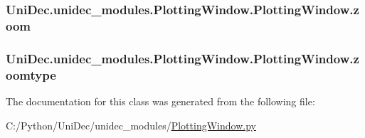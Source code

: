 \subsubsection[{zoom}]{\setlength{\rightskip}{0pt plus 5cm}Uni\+Dec.\+unidec\+\_\+modules.\+Plotting\+Window.\+Plotting\+Window.\+zoom}\label{class_uni_dec_1_1unidec__modules_1_1_plotting_window_1_1_plotting_window_afa368ae8c91913df4d9af81d0ef285a1}
\hypertarget{class_uni_dec_1_1unidec__modules_1_1_plotting_window_1_1_plotting_window_aaeeeec6814f8ea063a9fa3ee2a4d305e}{}
\subsubsection[{zoomtype}]{\setlength{\rightskip}{0pt plus 5cm}Uni\+Dec.\+unidec\+\_\+modules.\+Plotting\+Window.\+Plotting\+Window.\+zoomtype}\label{class_uni_dec_1_1unidec__modules_1_1_plotting_window_1_1_plotting_window_aaeeeec6814f8ea063a9fa3ee2a4d305e}


The documentation for this class was generated from the following file\+:\begin{DoxyCompactItemize}
\item 
C\+:/\+Python/\+Uni\+Dec/unidec\+\_\+modules/\hyperlink{_plotting_window_8py}{Plotting\+Window.\+py}\end{DoxyCompactItemize}
